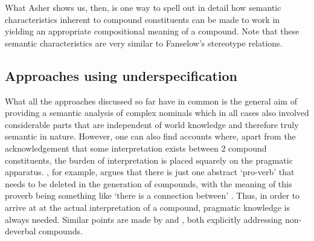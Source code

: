 What Asher shows us, then, is one way to spell out in detail how
semantic characteristics inherent to compound constituents can be made
to work in yielding an appropriate compositional meaning of a
compound. Note that these semantic characteristics are very similar to
Fanselow's stereotype relations.

\subsection{Approaches using underspecification}
\label{sec:other_solutions}
What all the approaches discussed so far have in common is the general
aim of providing a semantic analysis of complex nominals which in all
cases also involved considerable parts that are independent of world
knowledge and therefore truly semantic in nature. However, one can also
find accounts where, apart from
the acknowledgement that some
interpretation exists between 2 compound constituents,
the burden of interpretation is placed squarely on
the pragmatic apparatus.
\citet[45--46]{Bauer:1979}, for example, argues that there is
just one abstract `pro-verb' that needs to be deleted in the
generation of compounds, with the meaning of this proverb being
something like `there is a connection between'
\citep[46]{Bauer:1979}. Thus, in order to arrive at at the actual
interpretation of a compound, pragmatic knowledge is always needed.
Similar points are made by \citet[23]{Selkirk:1982} and
\citet[49]{Lieber:2004}, both explicitly
addressing non-deverbal compounds.  

